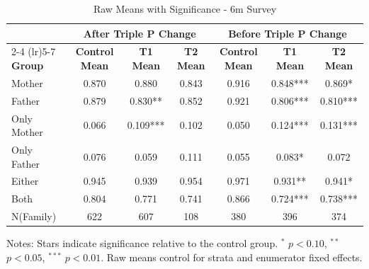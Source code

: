 \begin{table}[htbp]
\centering
\begin{threeparttable}
\caption{Raw Means with Significance  - 6m Survey}
\begin{tabular}{lcccccc}
\toprule
& \multicolumn{3}{c}{After Triple P Change} & \multicolumn{3}{c}{Before Triple P Change} \\
\cmidrule(lr){2-4} \cmidrule(lr){5-7}
\textbf{Group} & \textbf{Control Mean} & \textbf{T1 Mean} & \textbf{T2 Mean} & \textbf{Control Mean} & \textbf{T1 Mean} & \textbf{T2 Mean} \\
\midrule
Mother &  0.870 &  0.880 &  0.843 &   0.916 &  0.848*** &  0.869* \\
Father &  0.879 &  0.830** &  0.852 & 0.921 &  0.806*** &  0.810*** \\
Only Mother &  0.066 &  0.109*** &  0.102 & 0.050 &  0.124*** &  0.131***  \\
Only Father &  0.076 &  0.059 &  0.111 & 0.055 &  0.083* &  0.072 \\
Either &  0.945 &  0.939 &  0.954 &  0.971 &  0.931** &  0.941*  \\
Both &  0.804 &  0.771 &  0.741 &  0.866 &  0.724*** &  0.738*** \\
N(Family) & 622 & 607 & 108  & 380 & 396 & 374 \\
\bottomrule
\end{tabular}
\begin{tablenotes}
\small
Notes: Stars indicate significance relative to the control group. 
$^{*}$ $p<0.10$, $^{**}$ $p<0.05$, $^{***}$ $p<0.01$.
Raw means control for strata and enumerator fixed effects.
\end{tablenotes}
\end{threeparttable}
\end{table}


